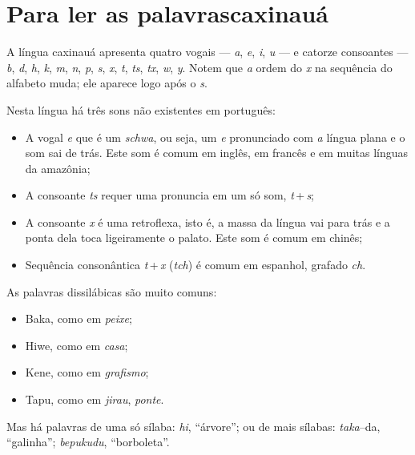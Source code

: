 \chapter[Para ler as palavras caxinauá]{Para ler as palavras\break caxinauá}

A língua caxinauá apresenta quatro vogais --- \textit{a}, \textit{e}, \textit{i}, \textit{u} --- e catorze consoantes --- \textit{b}, \textit{d}, \textit{h}, \textit{k}, \textit{m}, \textit{n}, \textit{p}, \textit{s}, \textit{x}, \textit{t}, \textit{ts}, \textit{tx}, \textit{w}, \textit{y}. Notem que \textit{a} ordem do \textit{x} na sequência do alfabeto muda;
ele aparece logo após o \textit{s}.

Nesta língua há três sons não existentes em português:

\begin{itemize}
\item A vogal \textit{e} que é um \textit{schwa}, ou seja, um \textit{e} pronunciado com \textit{a} língua plana e o som sai de trás. Este som é comum em inglês, em francês e em muitas línguas da amazônia;

\item A consoante \textit{ts} requer uma pronuncia em um só som, \textit{t}\,+\,\textit{s};

\item A consoante \textit{x} é uma retroflexa, isto é, a massa da língua vai para trás e a ponta dela toca ligeiramente o palato. Este som é comum em chinês;

\item Sequência consonântica \textit{t}\,+\,\textit{x} (\textit{tch}) é comum em espanhol, grafado \textit{ch}.
\end{itemize}

As palavras dissilábicas são muito comuns:

\begin{itemize}
\item Baka, como em \textit{peixe};
\item Hiwe, como em \textit{casa};
\item Kene, como em \textit{grafismo};
\item Tapu, como em \textit{jirau}, \textit{ponte}.
\end{itemize}

Mas há palavras de uma só sílaba: \textit{hi}, ``árvore''; ou de mais sílabas: \textit{taka}--da, ``galinha''; \textit{bepukudu}, ``borboleta''.


